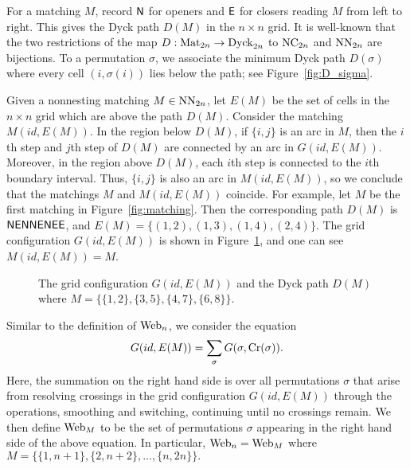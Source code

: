 For a matching $M$, record $\mathsf{N}$ for openers and $\mathsf{E}$ for closers reading $M$
from left to right.
This gives the Dyck path $D(M)$ in the $n \times n$ grid.
It is well-known that the two restrictions of the map
\( D:\operatorname{Mat}_{2n}\rightarrow \operatorname{Dyck}_{2n} \) to \( \operatorname{NC}_{2n} \) and \( \operatorname{NN}_{2n} \)
are bijections.
To a permutation $\sigma$, we associate the minimum Dyck path \( D(\sigma) \)
where every cell \( (i,\sigma(i)) \) lies below the path;
see Figure~\ref{fig:D_sigma}.

Given a nonnesting matching \( M\in\operatorname{NN}_{2n} \), let \( E(M) \) be the set of
cells in the $n \times n$ grid which are above the path $D(M)$.
Consider the matching \( M(id,E(M)) \).
In the region below \( D(M) \), if \( \{i,j\} \) is an arc in \( M \), then the
\( i \)th step and \( j \)th step of \( D(M) \) are connected by an arc in
\( G(id,E(M)) \). Moreover, in the region above \( D(M) \), each
\( i \)th step is connected to the \( i \)th boundary interval.
Thus, \( \{i,j\} \) is also an arc in \( M(id,E(M)) \), so we conclude that the
matchings \( M \) and \( M(id,E(M)) \) coincide.
For example, let \( M \) be the first matching in Figure~\ref{fig:matching}.
Then the corresponding path \( D(M) \) is \( \mathsf{N}\mathsf{E}\mathsf{N}\mathsf{N}\mathsf{E}\mathsf{N}\mathsf{E}\mathsf{E} \),
and \( E(M) = \{ (1,2), (1,3), (1,4), (2,4) \} \).
The grid configuration \( G(id, E(M)) \) is shown in Figure~\ref{fig:G(id,E(M))},
and one can see \( M(id, E(M)) = M \).
\begin{figure}
  \centering
  \caption{The grid configuration \( G(id, E(M)) \) and the Dyck path \( D(M) \)
  where \( M=\{ \{1,2\},\{3,5\},\{4,7\},\{6,8\} \} \).}
  \label{fig:G(id,E(M))}
\end{figure}
Similar to the definition of \( \operatorname{Web}_n \), we consider the equation
\[
  G(id,E(M)) = \sum_\sigma G(\sigma,\operatorname{Cr}(\sigma)).
\]
Here, the summation on the right hand side is over all permutations $\sigma$ that
arise from resolving crossings in the grid configuration $G(id, E(M))$ through the
operations, smoothing and switching, continuing until no crossings remain.
We then define \( \operatorname{Web}_M \) to be the set of permutations \( \sigma \) appearing
in the right hand side of the above equation.
In particular, \( \operatorname{Web}_n = \operatorname{Web}_M \) where
\( M=\{ \{1,n+1\}, \{2,n+2\},\dots, \{n,2n\} \}. \)

